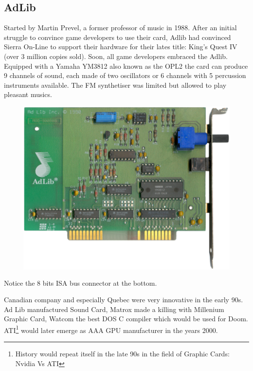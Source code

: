 \documentclass[book.tex]{subfiles}
\begin{document}
  \subsection{AdLib}
  Started by Martin Prevel, a former professor of music in 1988. After an initial struggle to convince game developers to use their card, Adlib had convinced Sierra On-Line to support their hardware for their lates title: King's Quest IV (over 3 million copies sold). Soon, all game developers embraced the Adlib. Equipped with a Yamaha YM3812 also known as the OPL2 the card can produce 9 channels of sound, each made of two oscillators or 6 channels with 5 percussion instruments available. The FM synthetiser was limited but allowed to play pleasant musics.\\
  \begin{figure}[H] \centering \includegraphics[width=\textwidth]{screenshots/hardware/adlib.png} \end{figure}
    Notice the 8 bits ISA bus connector at the bottom.
\par
{} Canadian company and especially Quebec were very innovative in the early 90s. Ad Lib manufactured Sound Card, Matrox made a killing with Millenium Graphic Card, Watcom the best DOS C compiler which would be used for Doom. ATI\footnote{History would repeat itself in the late 90s in the field of Graphic Cards: Nvidia Vs ATI} would later emerge as AAA GPU manufacturer in the years 2000.\\
  
  
\end{document}
